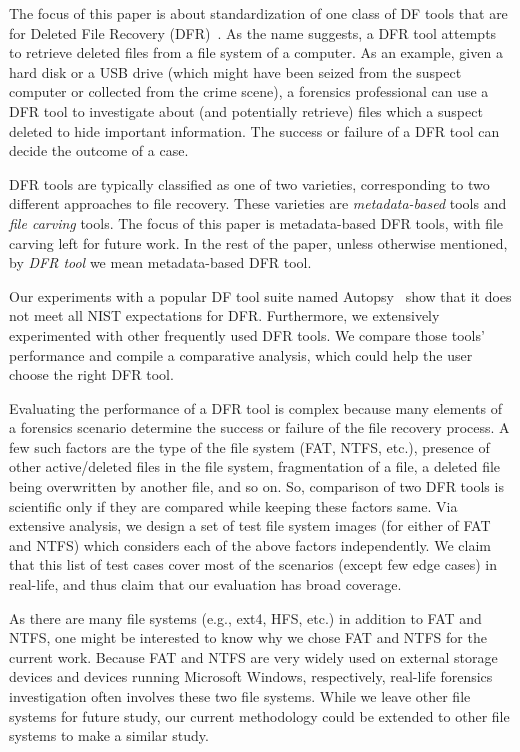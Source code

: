 \begin{paraphrase}
The focus of this paper is about standardization of one class of DF 
tools that are for Deleted File Recovery (DFR)~\cite{meta:dfr:standards}. 
As the name suggests, a DFR tool attempts to retrieve deleted files
from a file system of a computer. As an example, given a hard disk or a USB drive 
(which might have been seized from the suspect computer or collected from the crime scene), a 
forensics professional can use a DFR tool to investigate about (and potentially retrieve) files which 
a suspect deleted to hide important information. 
The success or failure of a DFR tool can decide the outcome of a case.  

DFR tools are typically classified as one of two varieties, corresponding to two different approaches to file recovery.
These varieties are \emph{metadata-based} tools and \emph{file carving} tools.
The focus of this paper is metadata-based DFR tools, with file carving left for future work.
In the rest of the paper, unless otherwise mentioned, by \emph{DFR tool} we mean metadata-based DFR tool.

Our experiments with a popular DF tool suite named Autopsy~\cite{autopsy} 
show that it does not meet all NIST expectations for DFR. 
Furthermore, we extensively experimented with other frequently used DFR tools. 
We compare those tools' performance and compile a comparative analysis, which could help the user choose the right DFR tool. 

Evaluating the performance of a DFR tool is complex because many elements of a forensics scenario determine 
the success or failure of the file recovery process. 
A few such factors are the type of the file system (FAT, NTFS, etc.), presence of other active/deleted 
files in the file system, fragmentation of a file, a deleted file being overwritten by another file, and so on.
So, comparison of two DFR tools is scientific only if they are compared while keeping these factors same. 
Via extensive analysis, we design a set of test file system images (for either of FAT and NTFS) which considers each of the above factors independently. 
We claim that this list of test cases cover most of the scenarios (except few edge cases) in real-life, and thus claim that our evaluation has broad coverage. 

As there are many file systems (e.g., ext4, HFS, etc.) in addition to FAT and NTFS, one might be interested to know why we chose FAT and NTFS for the current work. 
Because FAT and NTFS are very widely used on external storage devices and devices running Microsoft Windows, respectively,
real-life forensics investigation often involves these two file systems.
While we leave other file systems for future study, our current methodology could be 
extended to other file systems to make a similar study.


\end{paraphrase}
